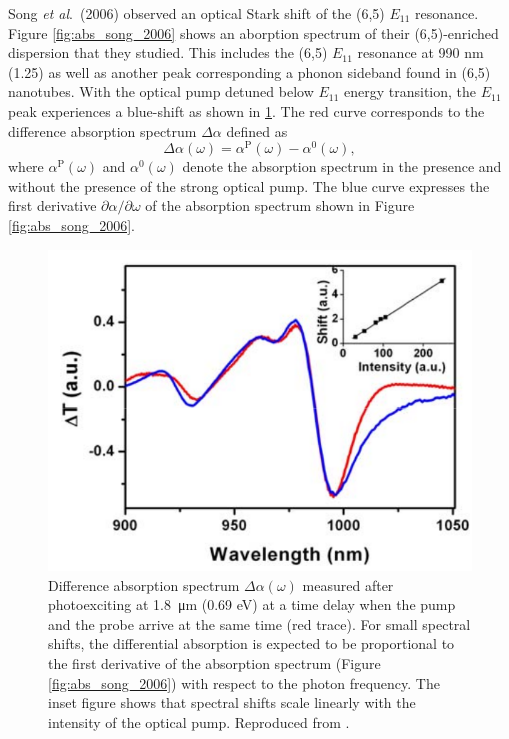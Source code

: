 Song \textit{et al}.\ (2006) observed an optical Stark shift of the (6,5) $E_{11}$ resonance. Figure \ref{fig:abs_song_2006} shows an aborption spectrum of their (6,5)-enriched dispersion that they studied. This includes the (6,5) $E_{11}$ resonance at 990 nm (1.25) as well as another peak corresponding a phonon sideband found in (6,5) nanotubes. With the optical pump detuned below $E_{11}$ energy transition, the $E_{11}$ peak experiences a blue-shift as shown in \ref{fig:dtt_song_2006}. The red curve corresponds to the difference absorption spectrum $\Delta \alpha$ defined as
\begin{equation}
	\Delta\alpha(\omega) = \alpha^\text{P}(\omega) - \alpha^0(\omega),
\end{equation}
where $\alpha^\text{P}(\omega)$ and $\alpha^\text{0}(\omega)$ denote the absorption spectrum in the presence and without the presence of the strong optical pump. The blue curve expresses  the first derivative $\partial\alpha / \partial\omega$ of the absorption spectrum shown in Figure \ref{fig:abs_song_2006}.

\begin{figure}[ht]
	\centering
	\includegraphics[scale=0.4]{images/chapter_prior_works/dtt_song_2006}
	\caption{Difference absorption spectrum $\Delta \alpha(\omega)$ measured after photoexciting at \SI{1.8}{\um} (0.69 eV) at a time delay when the pump and the probe arrive at the same time (red trace). For small spectral shifts, the differential absorption is expected to be proportional to the first derivative of the absorption spectrum (Figure \ref{fig:abs_song_2006}) with respect to the photon frequency. The inset figure shows that spectral shifts scale linearly with the intensity of the optical pump. Reproduced from \cite{song2006optical}.}
	\label{fig:dtt_song_2006}
\end{figure}

